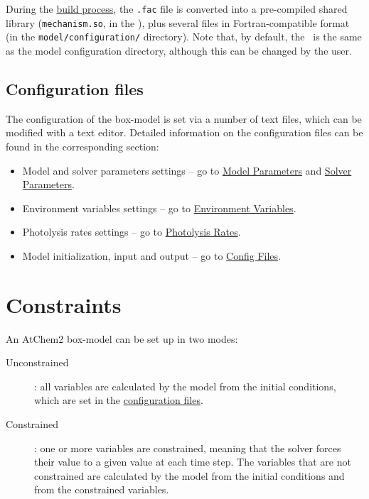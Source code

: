 During the \hyperref[subsec:build-process]{build process}, the
\texttt{.fac} file is converted into a pre-compiled shared library
(\texttt{mechanism.so}, in the \sharedir), plus several files in
Fortran-compatible format (in the \texttt{model/configuration/}
directory). Note that, by default, the \sharedir\ is the same as the
model configuration directory, although this can be changed by the
user.

\subsection{Configuration files} \label{subsec:configuration-files}

The configuration of the box-model is set via a number of text files,
which can be modified with a text editor. Detailed information on the
configuration files can be found in the corresponding section:

\begin{itemize}
\item Model and solver parameters settings -- go to
  \hyperref[sec:model-parameters]{Model Parameters} and
  \hyperref[sec:solver-parameters]{Solver Parameters}.
\item Environment variables settings -- go to
  \hyperref[sec:environment-variables]{Environment Variables}.
\item Photolysis rates settings -- go to
  \hyperref[sec:photolysis-rates]{Photolysis Rates}.
\item Model initialization, input and output -- go to
  \hyperref[sec:config-files]{Config Files}.
\end{itemize}

\section{Constraints} \label{sec:constraints}

An AtChem2 box-model can be set up in two modes:

\begin{description}
\item[Unconstrained]: all variables are calculated by the model from
  the initial conditions, which are set in the
  \hyperref[subsec:configuration-files]{configuration files}.
\item[Constrained]: one or more variables are constrained, meaning
  that the solver forces their value to a given value at each time
  step. The variables that are not constrained are calculated by the
  model from the initial conditions and from the constrained
  variables.
\end{description}

